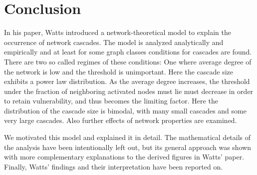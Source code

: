 \documentclass{sig-alternate-05-2015}
\begin{document}
\section{Conclusion}\label{sec:summary}

In his paper, Watts introduced a network-theoretical model to explain the occurrence of network cascades. The model is analyzed analytically and empirically and at least for some graph classes conditions for cascades are found. There are two so called regimes of these conditions: One where average degree of the network is low and the threshold is unimportant. Here the cascade size exhibits a power law distribution. As the average degree increases, the threshold under the fraction of neighboring activated nodes must lie must decrease in order to retain vulnerability, and thus becomes the limiting factor. Here the distribution of the cascade size is bimodal, with many small cascades and some very large cascades. Also further effects of network properties are examined.

We motivated this model and explained it in detail. The mathematical details of the analysis have been intentionally left out, but its general approach was shown with more complementary explanations to the derived figures in Watts' paper. Finally, Watts' findings and their interpretation have been reported on.




\end{document}
